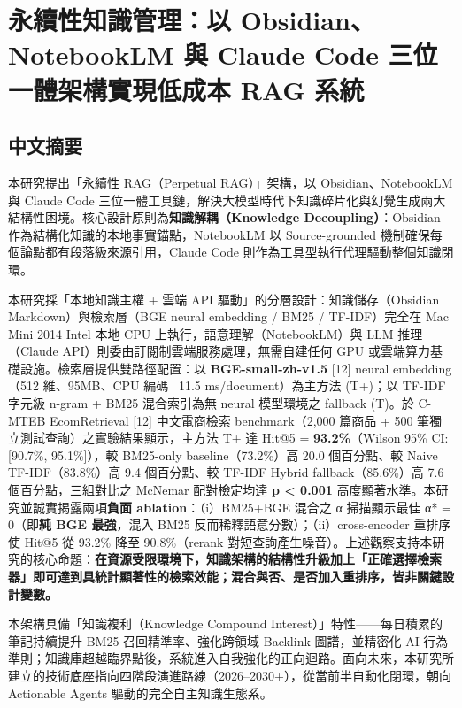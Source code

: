 \chapter{永續性知識管理：以 Obsidian、NotebookLM 與 Claude Code
三位一體架構實現低成本 RAG
系統}\label{ux6c38ux7e8cux6027ux77e5ux8b58ux7ba1ux7406ux4ee5-obsidiannotebooklm-ux8207-claude-code-ux4e09ux4f4dux4e00ux9ad4ux67b6ux69cbux5be6ux73feux4f4eux6210ux672c-rag-ux7cfbux7d71}

\section{中文摘要}\label{ux4e2dux6587ux6458ux8981}

本研究提出「永續性 RAG（Perpetual RAG）」架構，以 Obsidian、NotebookLM
與 Claude Code
三位一體工具鏈，解決大模型時代下知識碎片化與幻覺生成兩大結構性困境。核心設計原則為\textbf{知識解耦（Knowledge
Decoupling）}：Obsidian 作為結構化知識的本地事實錨點，NotebookLM 以
Source-grounded 機制確保每個論點都有段落級來源引用，Claude Code
則作為工具型執行代理驅動整個知識閉環。

本研究採「本地知識主權 + 雲端 API 驅動」的分層設計：知識儲存（Obsidian
Markdown）與檢索層（BGE neural embedding / BM25 / TF-IDF）完全在 Mac Mini
2014 Intel 本地 CPU 上執行，語意理解（NotebookLM）與 LLM 推理（Claude
API）則委由訂閱制雲端服務處理，無需自建任何 GPU 或雲端算力基礎設施。檢索層提供雙路徑配置：以
\textbf{BGE-small-zh-v1.5} {[}12{]} neural embedding（512 維、95MB、CPU
編碼 ~11.5 ms/document）為主方法 (T+)；以 TF-IDF 字元級 n-gram + BM25
混合索引為無 neural 模型環境之 fallback (T)。於 C-MTEB EcomRetrieval
{[}12{]} 中文電商檢索 benchmark（2,000 篇商品 + 500 筆獨立測試查詢）之實驗結果顯示，主方法
T+ 達 Hit@5 = \textbf{93.2\%}（Wilson 95\% CI: {[}90.7\%,
95.1\%{]}），較 BM25-only baseline（73.2\%）高 20.0 個百分點、較 Naive
TF-IDF（83.8\%）高 9.4 個百分點、較 TF-IDF Hybrid fallback（85.6\%）高 7.6
個百分點，三組對比之 McNemar 配對檢定均達 \textbf{p < 0.001}
高度顯著水準。本研究並誠實揭露兩項\textbf{負面 ablation}：（i）BM25+BGE 混合之
α 掃描顯示最佳 α* = 0（即\textbf{純 BGE 最強}，混入 BM25 反而稀釋語意分數）；（ii）cross-encoder
重排序使 Hit@5 從 93.2\% 降至 90.8\%（rerank 對短查詢產生噪音）。上述觀察支持本研究的核心命題：\textbf{在資源受限環境下，知識架構的結構性升級加上「正確選擇檢索器」即可達到具統計顯著性的檢索效能；混合與否、是否加入重排序，皆非關鍵設計變數。}

本架構具備「知識複利（Knowledge Compound
Interest）」特性------每日積累的筆記持續提升 BM25 召回精準率、強化跨領域
Backlink 圖譜，並精密化 AI
行為準則；知識庫超越臨界點後，系統進入自我強化的正向迴路。面向未來，本研究所建立的技術底座指向四階段演進路線（2026--2030+），從當前半自動化閉環，朝向
Actionable Agents 驅動的完全自主知識生態系。

